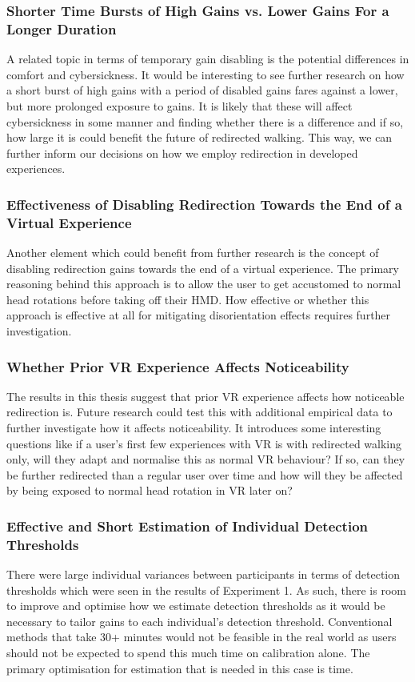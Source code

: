 \subsubsection{Shorter Time Bursts of High Gains vs. Lower Gains For a Longer Duration}
A related topic in terms of temporary gain disabling is the potential differences in comfort and cybersickness. It would be interesting to see further research on how a short burst of high gains with a period of disabled gains fares against a lower, but more prolonged exposure to gains. It is likely that these will affect cybersickness in some manner and finding whether there is a difference and if so, how large it is could benefit the future of redirected walking. This way, we can further inform our decisions on how we employ redirection in developed experiences.

\subsubsection{Effectiveness of Disabling Redirection Towards the End of a Virtual Experience}
Another element which could benefit from further research is the concept of disabling redirection gains towards the end of a virtual experience. The primary reasoning behind this approach is to allow the user to get accustomed to normal head rotations before taking off their HMD. How effective or whether this approach is effective at all for mitigating disorientation effects requires further investigation.
  
\subsubsection{Whether Prior VR Experience Affects Noticeability}
The results in this thesis suggest that prior VR experience affects how noticeable redirection is. Future research could test this with additional empirical data to further investigate how it affects noticeability. It introduces some interesting questions like if a user's first few experiences with VR is with redirected walking only, will they adapt and normalise this as normal VR behaviour? If so, can they be further redirected than a regular user over time and how will they be affected by being exposed to normal head rotation in VR later on?

\subsubsection{Effective and Short Estimation of Individual Detection Thresholds}   
There were large individual variances between participants in terms of detection thresholds which were seen in the results of Experiment 1. As such, there is room to improve and optimise how we estimate detection thresholds as it would be necessary to tailor gains to each individual's detection threshold. Conventional methods that take 30+ minutes would not be feasible in the real world as users should not be expected to spend this much time on calibration alone. The primary optimisation for estimation that is needed in this case is time. 

